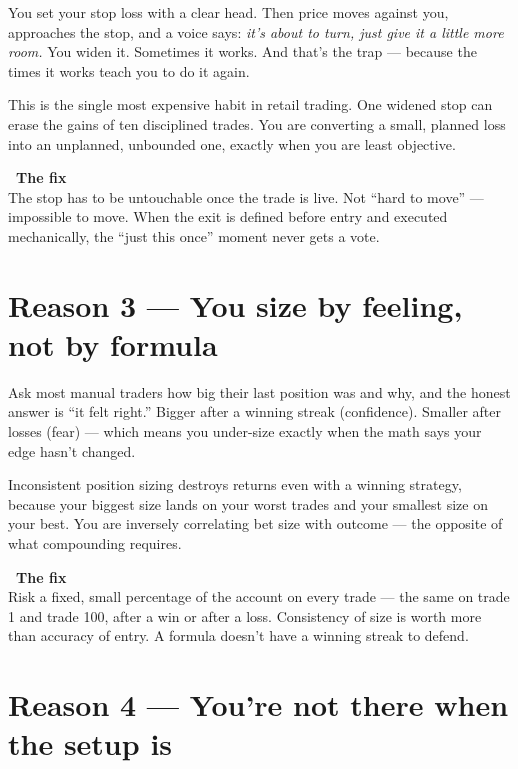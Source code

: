 \documentclass[11pt]{article}
\newcommand{\fixlabel}{{\color{neon}\bfseries\faArrowRight\ The fix }}
\begin{document}
You set your stop loss with a clear head. Then price moves against you, approaches the stop, and a voice says: \emph{it's about to turn, just give it a little more room.} You widen it. Sometimes it works. And that's the trap --- because the times it works teach you to do it again.

This is the single most expensive habit in retail trading. One widened stop can erase the gains of ten disciplined trades. You are converting a small, planned loss into an unplanned, unbounded one, exactly when you are least objective.

\begin{fixbox}
\fixlabel\\[0.4ex]
The stop has to be untouchable once the trade is live. Not ``hard to move'' --- impossible to move. When the exit is defined before entry and executed mechanically, the ``just this once'' moment never gets a vote.
\end{fixbox}

\newpage

\section{Reason 3 --- You size by feeling, not by formula}

Ask most manual traders how big their last position was and why, and the honest answer is ``it felt right.'' Bigger after a winning streak (confidence). Smaller after losses (fear) --- which means you under-size exactly when the math says your edge hasn't changed.

Inconsistent position sizing destroys returns even with a winning strategy, because your biggest size lands on your worst trades and your smallest size on your best. You are inversely correlating bet size with outcome --- the opposite of what compounding requires.

\begin{fixbox}
\fixlabel\\[0.4ex]
Risk a fixed, small percentage of the account on every trade --- the same on trade 1 and trade 100, after a win or after a loss. Consistency of size is worth more than accuracy of entry. A formula doesn't have a winning streak to defend.
\end{fixbox}

\section{Reason 4 --- You're not there when the setup is}
\end{document}
